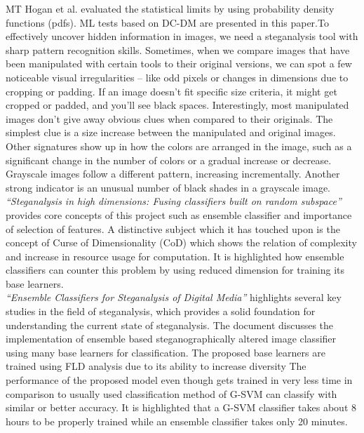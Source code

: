 MT Hogan et al.\cite{3} evaluated the statistical limits by using probability density functions (pdfs). ML tests based on DC-DM are presented in this paper.To effectively uncover hidden information in images, we need a steganalysis tool with sharp pattern recognition skills. Sometimes, when we compare images that have been manipulated with certain tools to their original versions, we can spot a few noticeable visual irregularities – like odd pixels or changes in dimensions due to cropping or padding. If an image doesn't fit specific size criteria, it might get cropped or padded, and you'll see black spaces. Interestingly, most manipulated images don't give away obvious clues when compared to their originals. The simplest clue is a size increase between the manipulated and original images. Other signatures show up in how the colors are arranged in the image, such as a significant change in the number of colors or a gradual increase or decrease. Grayscale images follow a different pattern, increasing incrementally. Another strong indicator is an unusual number of black shades in a grayscale image.\\
\textit{``Steganalysis in high dimensions: Fusing classifiers built on random subspace''}\cite{8} provides core concepts of this project such as ensemble classifier and importance of selection of features. A distinctive subject which it has touched upon is the concept of Curse of Dimensionality (CoD) which shows the relation of complexity and increase in  resource usage for computation. It is highlighted how ensemble classifiers can counter this problem by using reduced dimension for training its base learners.\\
\textit{``Ensemble Classifiers for Steganalysis of Digital Media''}\cite{5} highlights several key studies in the field of steganalysis, which provides a solid foundation for understanding the current state of steganalysis. The document discusses the implementation of ensemble based steganographically altered image classifier using many base learners for classification. The proposed base learners are trained using FLD analysis due to its ability to increase diversity The performance of the proposed model even though gets trained in very less time in comparison to usually used classification method of G-SVM can classify with similar or better accuracy. It is highlighted that a G-SVM classifier takes about 8 hours to be properly trained while an ensemble classifier takes only 20 minutes.\\                   
